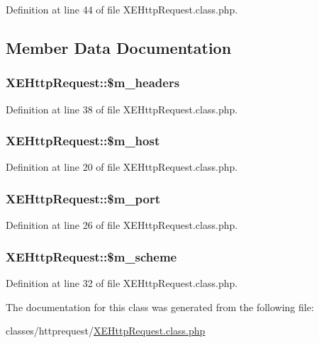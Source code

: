 Definition at line 44 of file X\-E\-Http\-Request.\-class.\-php.



\subsection{Member Data Documentation}
\hypertarget{classXEHttpRequest_a36df236b46af2f09dd9020096dbaed22}{
\subsubsection[{\$m\-\_\-headers}]{\setlength{\rightskip}{0pt plus 5cm}X\-E\-Http\-Request\-::\$m\-\_\-headers}}\label{classXEHttpRequest_a36df236b46af2f09dd9020096dbaed22}


Definition at line 38 of file X\-E\-Http\-Request.\-class.\-php.

\hypertarget{classXEHttpRequest_ad88148dced2b42017a96b2a5dd0b533a}{
\subsubsection[{\$m\-\_\-host}]{\setlength{\rightskip}{0pt plus 5cm}X\-E\-Http\-Request\-::\$m\-\_\-host}}\label{classXEHttpRequest_ad88148dced2b42017a96b2a5dd0b533a}


Definition at line 20 of file X\-E\-Http\-Request.\-class.\-php.

\hypertarget{classXEHttpRequest_a35c62f61b5ad2c200c53a58dd43a2784}{
\subsubsection[{\$m\-\_\-port}]{\setlength{\rightskip}{0pt plus 5cm}X\-E\-Http\-Request\-::\$m\-\_\-port}}\label{classXEHttpRequest_a35c62f61b5ad2c200c53a58dd43a2784}


Definition at line 26 of file X\-E\-Http\-Request.\-class.\-php.

\hypertarget{classXEHttpRequest_a501919f00934ef2cc76300fa32c2f19d}{
\subsubsection[{\$m\-\_\-scheme}]{\setlength{\rightskip}{0pt plus 5cm}X\-E\-Http\-Request\-::\$m\-\_\-scheme}}\label{classXEHttpRequest_a501919f00934ef2cc76300fa32c2f19d}


Definition at line 32 of file X\-E\-Http\-Request.\-class.\-php.



The documentation for this class was generated from the following file\-:\begin{DoxyCompactItemize}
\item 
classes/httprequest/\hyperlink{XEHttpRequest_8class_8php}{X\-E\-Http\-Request.\-class.\-php}\end{DoxyCompactItemize}
